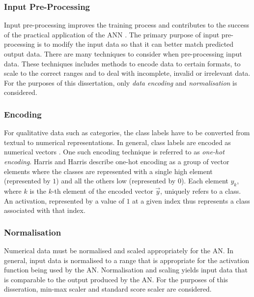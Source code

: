 \subsubsection{Input Pre-Processing}\label{sec:anns:an:input:input_pre_processing}

Input pre-processing improves the training process and contributes to the success of the practical application of the \ac{ANN} \cite{ref:kuzniar:2017}. The primary purpose of input pre-processing is to modify the input data so that it can better match predicted output data. There are many techniques to consider when pre-processing input data. These techniques includes methods to encode data to certain formats, to scale to the correct ranges and to deal with incomplete, invalid or irrelevant data. For the purposes of this dissertation, only \textit{data encoding} and \textit{normalisation} is considered.


\subsubsection{Encoding}\label{sec:anns:an:input:encoding}

For qualitative data such as categories, the class labels have to be converted from textual to numerical representations. In general, class labels are encoded as numerical vectors \cite{ref:srinidhi:2018, ref:brownlee:2017:one-hot}. One such encoding technique is referred to as \textit{one-hot encoding}. Harris and Harris \cite{ref:harris:2010} describe one-hot encoding as a group of vector elements where the classes are represented with a single high element (represented by $1$) and all the others low (represented by $0$). Each element $y_k$, where $k$ is the $k$-th element of the encoded vector $\vec{y}$, uniquely refers to a class. An activation, represented by a value of $1$ at a given index thus represents a class associated with that index.

\subsubsection{Normalisation}\label{sec:anns:an:input:normalisation}

Numerical data must be normalised and scaled appropriately for the \ac{AN}. In general, input data is normalised to a range that is appropriate for the activation function being used by the \ac{AN}. Normalisation and scaling yields input data that is comparable to the output produced by the \ac{AN}. For the purposes of this disseration, min-max scaler \cite{ref:al:2006} and standard score scaler \cite{ref:jain:2005} are considered.

